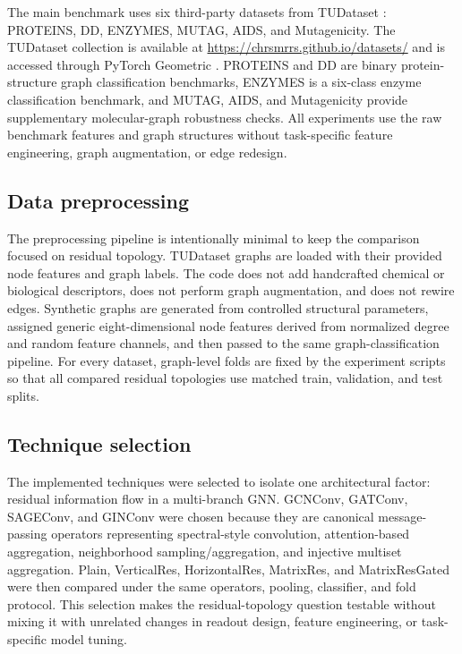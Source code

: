 The main benchmark uses six third-party datasets from TUDataset \cite{morris2020tudataset}: PROTEINS, DD, ENZYMES, MUTAG, AIDS, and Mutagenicity. The TUDataset collection is available at \url{https://chrsmrrs.github.io/datasets/} and is accessed through PyTorch Geometric \cite{fey2019fast}. PROTEINS and DD are binary protein-structure graph classification benchmarks, ENZYMES is a six-class enzyme classification benchmark, and MUTAG, AIDS, and Mutagenicity provide supplementary molecular-graph robustness checks. All experiments use the raw benchmark features and graph structures without task-specific feature engineering, graph augmentation, or edge redesign.

\subsection{Data preprocessing}

The preprocessing pipeline is intentionally minimal to keep the comparison focused on residual topology. TUDataset graphs are loaded with their provided node features and graph labels. The code does not add handcrafted chemical or biological descriptors, does not perform graph augmentation, and does not rewire edges. Synthetic graphs are generated from controlled structural parameters, assigned generic eight-dimensional node features derived from normalized degree and random feature channels, and then passed to the same graph-classification pipeline. For every dataset, graph-level folds are fixed by the experiment scripts so that all compared residual topologies use matched train, validation, and test splits.

\subsection{Technique selection}

The implemented techniques were selected to isolate one architectural factor: residual information flow in a multi-branch GNN. GCNConv, GATConv, SAGEConv, and GINConv were chosen because they are canonical message-passing operators representing spectral-style convolution, attention-based aggregation, neighborhood sampling/aggregation, and injective multiset aggregation. Plain, VerticalRes, HorizontalRes, MatrixRes, and MatrixResGated were then compared under the same operators, pooling, classifier, and fold protocol. This selection makes the residual-topology question testable without mixing it with unrelated changes in readout design, feature engineering, or task-specific model tuning.

